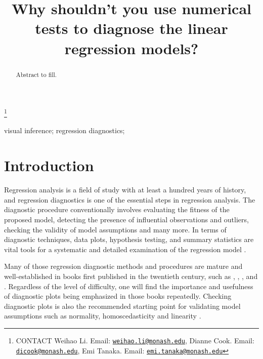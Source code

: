 \documentclass[]{interact}
\theoremstyle{plain}%
\theoremstyle{definition}
\theoremstyle{remark}
\begin{document}

\title{Why shouldn't you use numerical tests to diagnose the linear
regression models?}


\author{
}

\thanks{CONTACT Weihao
Li. Email: \href{mailto:weihao.li@monash.edu}{\nolinkurl{weihao.li@monash.edu}}, Dianne
Cook. Email: \href{mailto:dicook@monash.edu}{\nolinkurl{dicook@monash.edu}}, Emi
Tanaka. Email: \href{mailto:emi.tanaka@monash.edu}{\nolinkurl{emi.tanaka@monash.edu}}}

\maketitle

\begin{abstract}
Abstract to fill.
\end{abstract}

\begin{keywords}
visual inference; regression diagnostics;
\end{keywords}

\hypertarget{introduction}{%
\section{Introduction}\label{introduction}}

Regression analysis is a field of study with at least a hundred years of
history, and regression diagnostics is one of the essential steps in
regression analysis. The diagnostic procedure conventionally involves
evaluating the fitness of the proposed model, detecting the presence of
influential observations and outliers, checking the validity of model
assumptions and many more. In terms of diagnostic techniques, data
plots, hypothesis testing, and summary statistics are vital tools for a
systematic and detailed examination of the regression model
\citep{mansfield1987diagnostic}.

Many of those regression diagnostic methods and procedures are mature
and well-established in books first published in the twentieth century,
such as \citet{draper_applied_2014},
\citet{montgomery_introduction_2012}, \citet{belsley_regression_1980},
\citet{cook_applied_1999} and \citet{cook1982residuals}. Regardless of
the level of difficulty, one will find the importance and usefulness of
diagnostic plots being emphasized in those books repeatedly. Checking
diagnostic plots is also the recommended starting point for validating
model assumptions such as normality, homoscedasticity and linearity
\citep{anscombe_examination_1963}.
\end{document}
